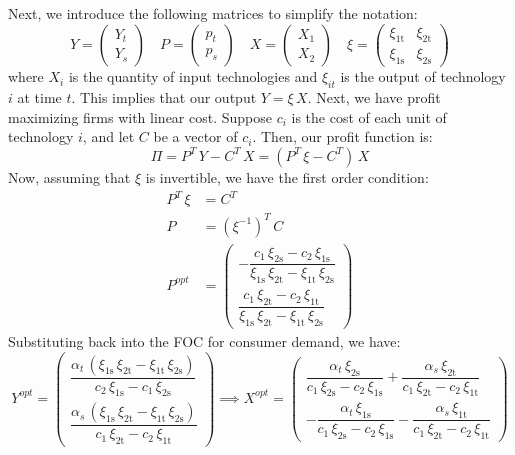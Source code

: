 \documentclass[12pt,a4paper]{extarticle}
\begin{document}
Next, we introduce the following matrices to simplify the notation: 
$$
Y = \begin{pmatrix}
Y_t \\
Y_s 
\end{pmatrix}
\quad 
P = \begin{pmatrix}
p_t \\
p_s 
\end{pmatrix}
\quad 
X = \begin{pmatrix}
X_1 \\
X_2 
\end{pmatrix}
\quad 
\xi = \begin{pmatrix}
\xi _{\mathrm{1t}} & \xi _{\mathrm{2t}}\\ \xi _{\mathrm{1s}} & \xi _{\mathrm{2s}}
\end{pmatrix}$$
where $X_i$ is the quantity of input technologies and $\xi_{it}$ is the output of technology $i$ at time $t$. This implies that our output $Y = \xi \,X$. Next, we have profit maximizing firms with linear cost. Suppose $c_i$ is the cost of each unit of technology $i$, and let $C$ be a vector of $c_i$. Then, our profit function is:
$$\Pi = P^T \, Y - C^T \, X = \left(P^T \, \xi - C^T   \right)\, X$$
Now, assuming that $\xi$ is invertible, we have the first order condition:
\begin{align*}
P^T\, \xi &= C^T \\
P &= (\xi^{-1})^T \, C  \\
P^{opt} &= \begin{pmatrix}
-\dfrac{c_{1}\,\xi _{\mathrm{2s}}-c_{2}\,\xi _{\mathrm{1s}}}{\xi _{\mathrm{1s}}\,\xi _{\mathrm{2t}}-\xi _{\mathrm{1t}}\,\xi _{\mathrm{2s}}}  \\[2ex]
\dfrac{c_{1}\,\xi _{\mathrm{2t}}-c_{2}\,\xi _{\mathrm{1t}}}{\xi _{\mathrm{1s}}\,\xi _{\mathrm{2t}}-\xi _{\mathrm{1t}}\,\xi _{\mathrm{2s}}} 
\end{pmatrix}
\end{align*}
Substituting back into the FOC for consumer demand, we have:
$$
Y^{opt} = \begin{pmatrix}
\dfrac{\alpha _{t}\,\left(\xi _{\mathrm{1s}}\,\xi _{\mathrm{2t}}-\xi _{\mathrm{1t}}\,\xi _{\mathrm{2s}}\right)}{c_{2}\,\xi _{\mathrm{1s}} - c_{1}\,\xi _{\mathrm{2s}}} \\[2ex]
\dfrac{\alpha _{s}\,\left(\xi _{\mathrm{1s}}\,\xi _{\mathrm{2t}}-\xi _{\mathrm{1t}}\,\xi _{\mathrm{2s}}\right)}{c_{1}\,\xi _{\mathrm{2t}}-c_{2}\,\xi _{\mathrm{1t}}} 
\end{pmatrix}
\implies 
X^{opt} = \begin{pmatrix}
\dfrac{\alpha _{t}\,\xi _{\mathrm{2s}}}{c_{1}\,\xi _{\mathrm{2s}}-c_{2}\,\xi _{\mathrm{1s}}}+\dfrac{\alpha _{s}\,\xi _{\mathrm{2t}}}{c_{1}\,\xi _{\mathrm{2t}}-c_{2}\,\xi _{\mathrm{1t}}} \\[2ex] 
-\dfrac{\alpha _{t}\,\xi _{\mathrm{1s}}}{c_{1}\,\xi _{\mathrm{2s}}-c_{2}\,\xi _{\mathrm{1s}}}-\dfrac{\alpha _{s}\,\xi _{\mathrm{1t}}}{c_{1}\,\xi _{\mathrm{2t}}-c_{2}\,\xi _{\mathrm{1t}}}
\end{pmatrix}
$$
\end{document}
